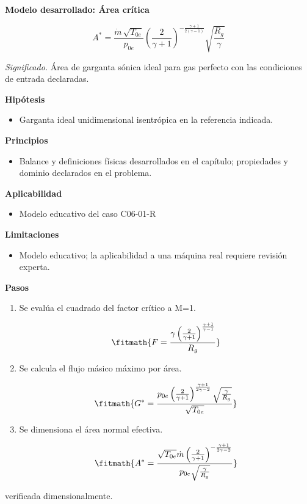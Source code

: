 \documentclass[10pt,openany]{book}
\begin{document}
\begin{tcolorbox}[title={Desarrollos del modelo}, studiumdef, breakable]

\noindent\textbf{Modelo desarrollado: Área crítica}

\begin{equation}
A^*=\frac{\dot m\,\sqrt{T_{0e}}}{p_{0e}}\left(\frac{2}{\gamma+1}\right)^{-\frac{\gamma+1}{2(\gamma-1)}}\sqrt{\frac{R_g}{\gamma}}
\label{eq:EC-C06}
\end{equation}

\noindent\textit{Significado.} Área de garganta sónica ideal para gas perfecto con las condiciones de entrada declaradas.

\noindent\textbf{Hipótesis}
\begin{itemize}
\item Garganta ideal unidimensional isentrópica en la referencia indicada.
\end{itemize}

\noindent\textbf{Principios}
\begin{itemize}
\item Balance y definiciones físicas desarrollados en el capítulo; propiedades y dominio declarados en el problema.
\end{itemize}

\noindent\textbf{Aplicabilidad}
\begin{itemize}
\item Modelo educativo del caso C06-01-R
\end{itemize}

\noindent\textbf{Limitaciones}
\begin{itemize}
\item Modelo educativo; la aplicabilidad a una máquina real requiere revisión experta.
\end{itemize}

\noindent\textbf{Pasos}
\begin{enumerate}
\item
Se evalúa el cuadrado del factor crítico a M=1.

\[
\fitmath{F=\frac{\gamma \left(\frac{2}{\gamma + 1}\right)^{\frac{\gamma + 1}{\gamma - 1}}}{R_g}}
\]
\item
Se calcula el flujo másico máximo por área.

\[
\fitmath{G^{*}=\frac{p_{0e} \left(\frac{2}{\gamma + 1}\right)^{\frac{\gamma + 1}{2 \gamma - 2}} \sqrt{\frac{\gamma}{R_g}}}{\sqrt{T_{0e}}}}
\]
\item
Se dimensiona el área normal efectiva.

\[
\fitmath{A^{*}=\frac{\sqrt{T_{0e}} \dot m \left(\frac{2}{\gamma + 1}\right)^{- \frac{\gamma + 1}{2 \gamma - 2}}}{p_{0e} \sqrt{\frac{\gamma}{R_g}}}}
\]
\end{enumerate}

{\noindent\footnotesize verificada dimensionalmente.\par}
\end{tcolorbox}
\end{document}
